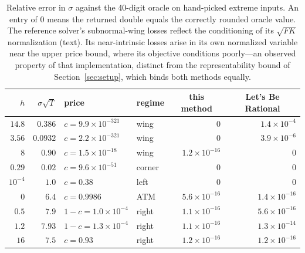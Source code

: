 \documentclass[11pt]{article}
\begin{document}
\begin{table}[t]
\centering
\small
\begin{tabular}{r r l l r r}
\toprule
$h$ & $\sigma\sqrt T$ & price & regime & \multicolumn{1}{c}{this method} & \multicolumn{1}{c}{Let's Be Rational} \\
\midrule
$14.8$  & $0.386$  & $c=9.9\times10^{-321}$    & wing   & $0$                  & $1.4\times10^{-4}$ \\
$3.56$  & $0.0932$ & $c=2.2\times10^{-321}$    & wing   & $0$                  & $3.9\times10^{-6}$ \\
$8$     & $0.90$   & $c=1.5\times10^{-18}$     & wing   & $1.2\times10^{-16}$  & $0$ \\
$0.29$  & $0.02$   & $c=9.6\times10^{-51}$     & corner & $0$                  & $0$ \\
$10^{-4}$ & $1.0$  & $c=0.38$                  & left   & $0$                  & $0$ \\
$0$     & $6.4$    & $c=0.9986$                & ATM    & $5.6\times10^{-16}$  & $1.4\times10^{-16}$ \\
$0.5$   & $7.9$    & $1-c=1.0\times10^{-4}$    & right  & $1.1\times10^{-16}$  & $5.6\times10^{-16}$ \\
$1.2$   & $7.93$   & $1-c=1.3\times10^{-4}$    & right  & $1.1\times10^{-16}$  & $1.3\times10^{-14}$ \\
$16$    & $7.5$    & $c=0.93$                  & right  & $1.2\times10^{-16}$  & $1.2\times10^{-16}$ \\
\bottomrule
\end{tabular}
\caption{Relative error in $\sigma$ against the 40-digit oracle on hand-picked extreme inputs. An entry of $0$ means the returned double equals the correctly rounded oracle value. The reference solver's subnormal-wing losses reflect the conditioning of its $\sqrt{FK}$ normalization (text). Its near-intrinsic losses arise in its own normalized variable near the upper price bound, where its objective conditions poorly---an observed property of that implementation, distinct from the representability bound of Section~\ref{sec:setup}, which binds both methods equally.}
\label{tab:edge}
\end{table}
\end{document}
